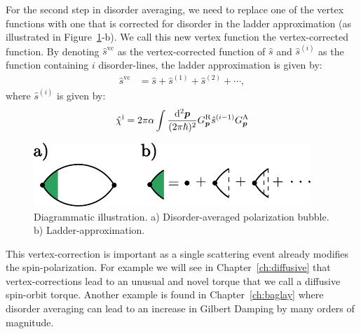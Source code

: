 For the second step in disorder averaging, we need to replace one of the vertex functions with one that is corrected for disorder in the ladder approximation (as illustrated in Figure~\ref{sd:fig:diagrams}-b). We call this new vertex function the vertex-corrected function. 
By denoting $\hat{s}^{\text{vc}}$ as the vertex-corrected function of $\hat{s}$ and $\hat{s}^{(i)}$ as the function containing $i$ disorder-lines, the ladder approximation is given by:
\begin{align}
    \hat{s}^\text{vc}
       & =           
        \hat{s}+\hat{s}^{(1)}+\hat{s}^{(2)}+\cdots,
        \label{sd:eq:ladder}
\end{align}
where $\hat{s}^{(i)}$ is given by:
\begin{align}
    \hat{\chi}^\text{i} = 2\pi\alpha\int\frac{\mathrm{d}^2\boldsymbol{p}}{(2\pi\hslash)^2} G_{\boldsymbol{p}}^\text{R}\hat{s}^{(i-1)}G_{\boldsymbol{p}}^\text{A}
    \label{eq:onedisorderline}
\end{align}

\begin{figure}
    \centering
    \includegraphics{gfx/bubble1.pdf}
    \caption{Diagrammatic illustration. a) Disorder-averaged polarization bubble. b) Ladder-approximation. }
    \label{sd:fig:diagrams}
\end{figure}
This vertex-correction is important as a single scattering event already modifies the spin-polarization. For example we will see in Chapter~\ref{ch:diffusive} that vertex-corrections lead to an unusual and novel torque that we call a diffusive spin-orbit torque. Another example is found in Chapter~\ref{ch:baglay} where disorder averaging can lead to an increase in Gilbert Damping by many orders of magnitude. 


